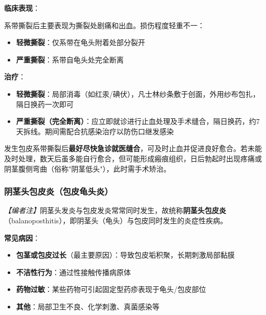 \vspace{0.5em}
\noindent\textbf{临床表现}：

系带撕裂后主要表现为撕裂处剧痛和出血。损伤程度轻重不一：
\begin{itemize}
	\item \textbf{轻微撕裂}：仅系带在龟头附着处部分裂开
	\item \textbf{严重撕裂}：系带自龟头处完全断离
\end{itemize}

\vspace{0.5em}
\noindent\textbf{治疗}：
\begin{itemize}
	\item \textbf{轻微撕裂}：局部消毒（如红汞/碘伏），凡士林纱条敷于创面，外用纱布包扎，隔日换药一次即可
	\item \textbf{严重撕裂（完全断离）}：应立即就诊进行止血处理及手术缝合，隔日换药，约7天拆线。期间需配合抗感染治疗以防伤口继发感染
\end{itemize}

\begin{tcolorbox}[colback=pink!5!white,colframe=red!50!black,title=贴心小叮咛]
发生包皮系带撕裂后\textbf{最好尽快急诊就医缝合}，可及时止血并促进良好愈合。若未能及时处理，数天后虽多能自行愈合，但可能形成瘢痕组织，日后勃起时出现疼痛或阴茎腹侧弯曲（俗称"阴茎低头"），此时需手术矫治。
\end{tcolorbox}

\subsubsection{阴茎头包皮炎（包皮龟头炎）}

\noindent\textit{【编者注】}阴茎头发炎与包皮发炎常常同时发生，故统称\textbf{阴茎头包皮炎}（balanoposthitis），即阴茎头（龟头）与包皮同时发生的炎症性疾病。

\vspace{0.5em}
\noindent\textbf{常见病因}：

\begin{itemize}
	\item \textbf{包茎或包皮过长}（最主要原因）：导致包皮垢积聚，长期刺激局部黏膜
	\item \textbf{不洁性行为}：通过性接触传播病原体
	\item \textbf{药物过敏}：某些药物可引起固定型药疹表现于龟头/包皮部位
	\item \textbf{其他}：局部卫生不良、化学刺激、真菌感染等
\end{itemize}

